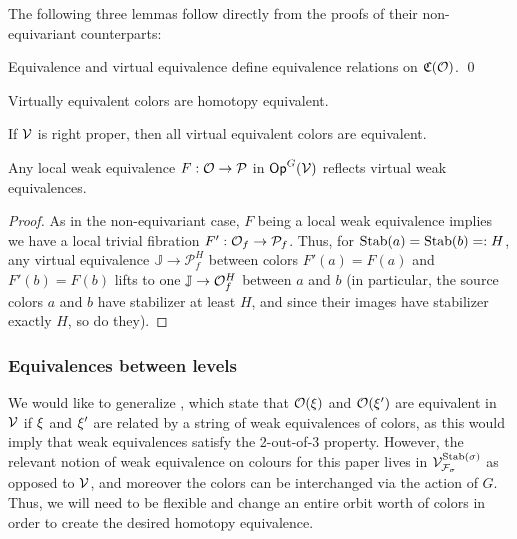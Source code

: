 \documentclass[psamsfonts,oneside,10pt,letterpaper
,draft
]{amsart}%
\renewcommand{\C}{\ensuremath{\mathfrak{C}}}
\renewcommand{\F}{\mathcal F}
\newcommand{\J}{\ensuremath{\mathbb{J}}}
\renewcommand{\1}{\ensuremath{\mathbb{id}}}
\renewcommand{\P}{\ensuremath{\mathcal{P}}}
\newcommand{\Vsigma}{\ensuremath{\V^{\Stab(\sigma)}_{\F_\sigma}}}
\begin{document}
The following three lemmas follow directly from the proofs of their non-equivariant counterparts:
\begin{lemma}
      Equivalence and virtual equivalence define equivalence relations on $\C(\O)$. \qed
\end{lemma}
\begin{lemma}
      Virtually equivalent colors are homotopy equivalent. 
\end{lemma}
\begin{lemma}
      If $\mathcal V$ is right proper, then all virtual equivalent colors are equivalent. 
\end{lemma}

\begin{lemma}
      Any local weak equivalence $F: \O\to \P$ in $\mathsf{Op}^G(\mathcal V)$ reflects virtual weak equivalences.
\end{lemma}
\begin{proof}
      As in the non-equivariant case, $F$ being a local weak equivalence implies
      we have a local trivial fibration $F': \O_f\to \P_f$.
      Thus, for $\mathrm{Stab}(a) = \mathrm{Stab}(b) =: H$, any virtual equivalence $\J \to \P_f^H$ between colors
      $F'(a) = F(a)$ and $F'(b) = F(b)$
      lifts to one $\J \to \O_f^H$ between $a$ and $b$
      (in particular,
      the source colors $a$ and $b$ have stabilizer at least $H$, and since their images have stabilizer exactly $H$, so do they). 
\end{proof}

\subsubsection{Equivalences between levels}

We would like to generalize \cite[4.14 and 4.15]{Cav14}, which state that
$\mathcal{O}(\xi)$ and $\mathcal{O}(\xi')$ are equivalent in $\mathcal V$ if $\xi$ and $\xi'$ are related by a string of weak equivalences of colors,
as this would imply that weak equivalences satisfy the 2-out-of-3 property.
However, the relevant notion of weak equivalence on colours for this paper lives in $\Vsigma$ as opposed to $\mathcal V$,
and moreover the colors can be interchanged via the action of $G$.
Thus, we will need to be flexible and change an entire orbit worth of colors in order to create the desired homotopy equivalence. 
\end{document}
